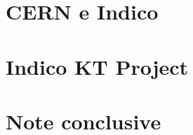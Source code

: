 \documentclass[oneside, openright, titlepage, fleqn, headinclude, 11pt, a4paper, BCOR5mm, footinclude]{scrbook}
\begin{document}
	\frenchspacing
	\raggedbottom
	\pagestyle{plain}
	

	
	
	\pagestyle{scrheadings}
	
	
%	
	
	
	
	
	\part{CERN e Indico}  \label{part:CERN_indico}
		
		
	
	\part{Indico KT Project} \label{part:indico_KT_project}
		
		
		
		
		
		
	
	\part{Note conclusive} \label{part:note_conclusive}
		
		
	
	
\end{document}
